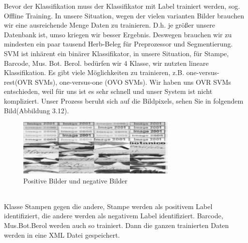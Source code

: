 \documentclass[10pt,a4paper]{report}
\begin{document}
Bevor der Klassifikation muss der Klassifikator mit Label trainiert werden, sog. Offline Training. In unsere Situation, wegen der vielen varianten Bilder brauchen wir eine ausreichende Menge Daten zu trainieren. D.h. je größer unsere Datenbank ist, umso kriegen wir besser Ergebnis. Deswegen brauchen wir zu mindesten ein paar tausend Herb-Beleg für Preprozessor und Segmentierung.
SVM ist inhärent ein binärer Klassifikator, in unsere Situation, für Stampe, Barcode, Mus. Bot. Berol. bedürfen wir 4 Klasse, wir nutzten lineare Klassifikation. Es gibt viele Möglichkeiten zu trainieren, z.B. one-versus-rest(OVR SVMs), one-versus-one (OVO SVMs). Wir haben uns OVR SVMs entschieden, weil für uns ist es sehr schnell und unser System ist nicht kompliziert. Unser Prozess beruht sich auf die Bildpixels, sehen Sie in folgendem Bild(Abbildung 3.12).\\
\begin{figure}[htbp] 
	\centering
	\includegraphics[width=0.7\textwidth]{Positivnegativ.png}
	\caption{Positive Bilder und negative Bilder}
	\label{fig:Bild 3.12}
\end{figure}\\
Klasse Stampen gegen die andere, Stampe werden als positivem Label identifiziert, die andere werden als negativem Label identifiziert. Barcode, Mus.Bot.Berol werden auch so trainiert. Dann die ganzen trainierten Daten  werden in eine XML Datei gespeichert.
\end{document}
